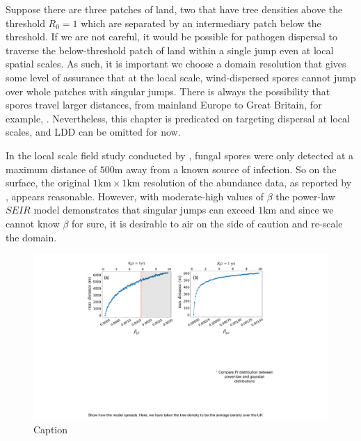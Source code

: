 Suppose there are three patches of land, two that have tree densities above the threshold $R_0 = 1$ which are separated by an intermediary patch below the threshold. If we are not careful, it would be possible for pathogen dispersal to traverse the below-threshold patch of land within a single jump even at local spatial scales. As such, it is important we choose a domain resolution that gives some level of assurance that at the local scale, wind-dispersed spores cannot jump over whole patches with singular jumps. There is always the possibility that spores travel larger distances, from mainland Europe to Great Britain, for example, \cite{freer2017tree, wylder2018evidence}. Nevertheless, this chapter is predicated on targeting dispersal at local scales, and LDD can be omitted for now.

In the local scale field study conducted by \cite{grosdidier2018tracking}, fungal spores were only detected at a maximum distance of $500\mathrm{m}$ away from a known source of infection. So on the surface, the original $1\mathrm{km} \times 1 \mathrm{km}$ resolution of the abundance data, as reported by \cite{hill.data}, appears reasonable. However, with moderate-high values of $\beta$ the power-law $SEIR$ model demonstrates that singular jumps can exceed $1\mathrm{km}$ and since we cannot know $\beta$ for sure, it is desirable to air on the side of caution and re-scale the domain.


\begin{figure}
    \centering
    \includegraphics[scale=0.40]{chapter6/figures/fig5-beta-vs-max_d.pdf}
    \caption{Caption}
    \label{fig:my_label}
\end{figure}



